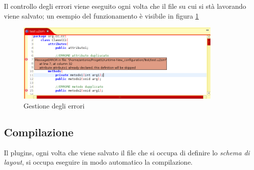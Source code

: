 Il controllo degli errori viene eseguito ogni volta che il file su cui si stà lavorando
viene salvato; un esempio del funzionamento è visibile in figura \ref{errorieditor}

\begin{figure}[htp]
\begin{center}
  \includegraphics[width=0.9\textwidth]{img/errori_editor.png}
  \caption[labelInTOC]{Gestione degli errori}
  \label{errorieditor} 
\end{center}
\end{figure} 

\subsection{Compilazione} 
Il plugins, ogni volta che viene salvato il file che si occupa di definire lo
\emph{schema di layout}, si occupa eseguire in modo automatico la compilazione.
